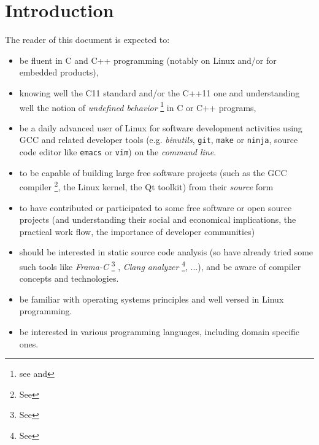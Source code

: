 \section{Introduction}

The reader of this document is expected to:
\begin{itemize}

  \item be fluent in C \cite{Kernighan:1988:CPL} and C++
    \cite{Stroustrup:2014:CplusPlus} programming (notably on Linux
    and/or for embedded products),

  \item knowing well the C11 standard
    \cite{C11:std,Memarian:2016:PLDI} and/or the C++11 one
    \cite{CplusPlus11:std} and understanding well the notion of
    \emph{undefined behavior} \footnote{see
      and } in C or C++
    programs,

  \item be a daily advanced user of Linux for software development
    activities using GCC and related developer tools
    (e.g. \textit{binutils}, \texttt{git}, \texttt{make} or
    \texttt{ninja}, source code editor like \texttt{emacs} or
    \texttt{vim}) on the \emph{command line}.


\item to be capable of building large free software projects (such as
  the GCC compiler \cite{gcc-internals} \footnote{See
    }, the Linux kernel, the Qt toolkit)
  from their \emph{source} form

\item to have contributed or participated to some free software or
  open source projects (and understanding their social and economical
  \cite{Weber:2004:SuccessOpenSource} implications, the practical work
  flow, the importance of developer communities)
  
\item should be interested in static source code analysis (so have
  already tried some such tools like \emph{Frama-C} \footnote{See
    } \cite{Cuoq:2012:Frama-C}, \emph{Clang
    analyzer} \footnote{See },
  ...), and be aware of compiler concepts and technologies.

\item be familiar with operating systems principles
  \cite{Tanenbaum:92:OS,ArpaciDusseau14-Book,OSTEP-web} and well
  versed in Linux programming.

  \item be interested in various programming languages, including
    domain specific ones.

\end{itemize}

